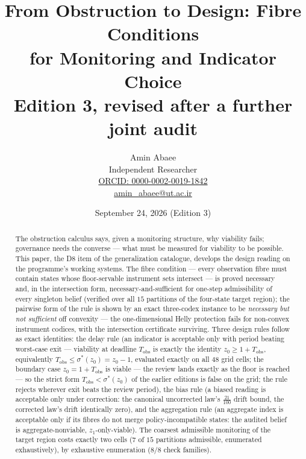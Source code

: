 \documentclass[10pt,twocolumn]{article}
\theoremstyle{definition}
\begin{document}
\title{From Obstruction to Design: Fibre Conditions\\ for Monitoring and Indicator Choice\\[0.2em]
{\large\rmfamily Edition 3, revised after a further joint audit}}
\author{Amin Abaee\\[0.35em]
{\small Independent Researcher}\\[0.55em]
{\small\href{https://orcid.org/0000-0002-0019-1842}{ORCID: 0000-0002-0019-1842}}\\[0.3em]
{\small\href{mailto:amin\_abaee@ut.ac.ir}{amin\_abaee@ut.ac.ir}}}
\date{September 24, 2026 (Edition 3)}
\maketitle

\begin{abstract}
The obstruction calculus says, given a monitoring structure, why viability
fails; governance needs the converse --- what must be measured for viability
to be possible. This paper, the D8 item of the generalization catalogue,
develops the design reading on the programme's working systems. The fibre
condition --- every observation fibre must contain states whose
floor-servable instrument sets intersect --- is proved necessary and, in the
intersection form, necessary-and-sufficient for one-step admissibility of
every singleton belief (verified over all $15$ partitions of the four-state
target region); the pairwise form of the rule is shown by an exact
three-codex instance to be \emph{necessary but not sufficient} off
convexity --- the one-dimensional Helly protection fails for non-convex
instrument codices, with the intersection certificate surviving. Three
design rules follow as exact identities: the delay rule (an indicator is
acceptable only with period beating worst-case exit --- viability at
deadline $T_{\mathrm{obs}}$ is exactly the identity
$z_0\ge1+T_{\mathrm{obs}}$, equivalently
$T_{\mathrm{obs}}\le\sigma^\ast(z_0)=z_0-1$, evaluated exactly on all $48$
grid cells; the boundary case $z_0 = 1 + T_{\mathrm{obs}}$ is viable ---
the review lands exactly as the floor is reached --- so the strict form
$T_{\mathrm{obs}} < \sigma^\ast(z_0)$ of the earlier editions is false on
the grid; the rule rejects wherever exit beats the review period), the
bias rule (a biased reading is acceptable only under correction: the
canonical uncorrected law's $\tfrac{21}{100}$ drift bound, the corrected
law's drift identically zero), and the aggregation rule (an aggregate index
is acceptable only if its fibres do not merge policy-incompatible states:
the audited belief is aggregate-nonviable, $z_1$-only-viable). The coarsest
admissible monitoring of the target region costs exactly two cells
($7$ of $15$ partitions admissible, enumerated exhaustively), by
exhaustive enumeration (8/8 check families).
\end{abstract}
\end{document}

